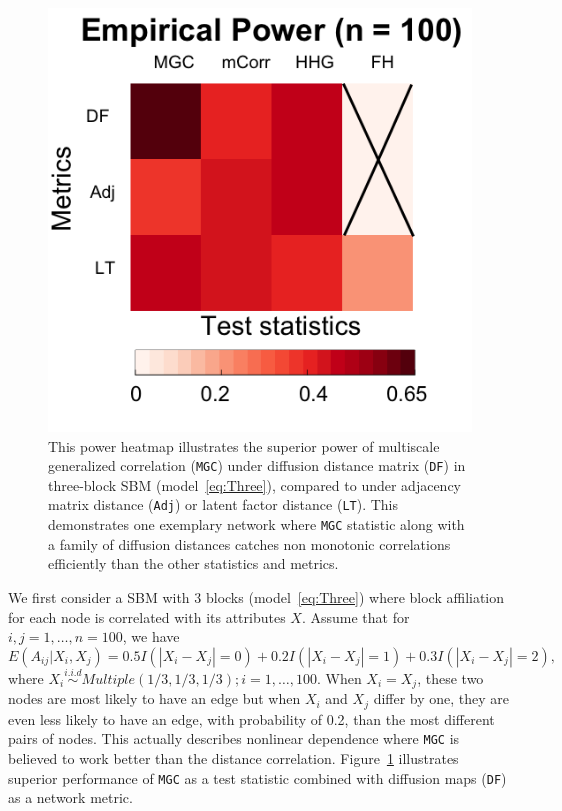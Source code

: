 \documentclass[11pt]{article}
\theoremstyle{definition}
\begin{document}
\begin{figure}
	\centering
	\includegraphics[width=0.4\paperwidth, height=0.4\paperwidth]{../Figure/ThreeSBM_results_simple.png}
	\caption{This power heatmap illustrates the superior power of multiscale generalized correlation (\texttt{MGC}) under diffusion distance matrix (\texttt{DF}) in three-block SBM (model~\ref{eq:Three}), compared to under adjacency matrix distance (\texttt{Adj}) or latent factor distance (\texttt{LT}). This demonstrates one exemplary network where \texttt{MGC} statistic along with a family of diffusion distances catches non monotonic correlations efficiently than the other statistics and metrics.}
	\label{fig:threeSBM}
\end{figure}
We first consider a SBM with $3$ blocks (model~\ref{eq:Three}) where block affiliation for each node is correlated with its attributes $X$. Assume that for $i,j = 1, \ldots , n = 100$, we have
\begin{equation}
\label{eq:Three}
E(A_{ij} | X_{i}, X_{j}) = 0.5 I(|X_{i} - X_{j}| = 0) + 0.2 I(|X_{i} - X_{j}| = 1) + 0.3 I(|X_{i} - X_{j}| = 2), 
\end{equation}
where $X_{i} \overset{i.i.d}{\sim} Multiple(1/3, 1/3, 1/3); i = 1, \ldots, 100$. When $X_{i} = X_{j}$, these two nodes are most likely to have an edge but when $X_{i}$ and  $X_{j}$ differ by one, they are even less likely to have an edge, with probability of 0.2, than the most different pairs of nodes. This actually describes nonlinear dependence where \texttt{MGC} is believed to work better than the distance correlation. Figure~\ref{fig:threeSBM} illustrates superior performance of \texttt{MGC} as a test statistic combined with diffusion maps (\texttt{DF}) as a network metric. 
\end{document}
